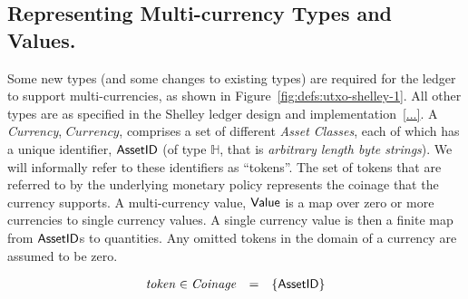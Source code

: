 \subsection*{Representing Multi-currency Types and Values.}
Some new types (and some changes to existing types) are required for
the ledger to support multi-currencies, as shown in Figure~\ref{fig:defs:utxo-shelley-1}.
All other types are as specified in the Shelley ledger design and implementation~\ref{...}.
A \emph{Currency}, $\mathit{Currency}$, comprises a set of different \emph{Asset Classes}, each of which has
a unique identifier, $\mathsf{AssetID}$  (of type $\mathbb{H}$, that is \emph{arbitrary length byte strings}). We will informally refer to these identifiers as ``tokens''.
The set of tokens that are referred to by the underlying monetary policy represents the coinage that the currency supports.  A multi-currency value, $\mathsf{Value}$ is a map over zero or more currencies
to single currency values.  A single currency value is then a finite map from
$\mathsf{AssetID}$s to quantities.  Any omitted tokens in the domain of a currency are assumed to be zero.

$$
 \begin{array}{lcl}
   \mathit{token} \in \mathit{Coinage} &=& \{ \mathsf{AssetID} \}
\end{array}
$$




